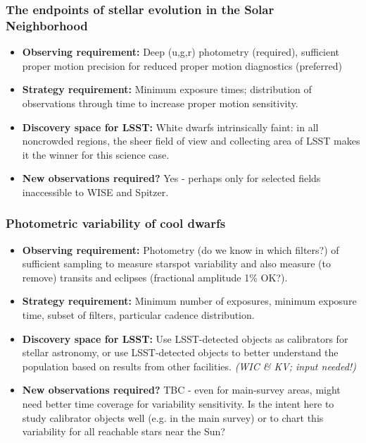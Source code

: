 \subsubsection{The endpoints of stellar evolution in the Solar Neighborhood}
\vspace{-2mm}
\begin{itemize}
\item {\bf Observing requirement:} Deep (u,g,r) photometry (required), sufficient proper motion precision for reduced proper motion diagnostics (preferred)
\vspace{-2mm}
\item {\bf Strategy requirement:} Minimum exposure times; distribution of observations through time to increase proper motion sensitivity.
\vspace{-2mm}
\item {\bf Discovery space for LSST:} White dwarfs intrinsically faint: in all noncrowded regions, the sheer field of view and collecting area of LSST makes it the winner for this science case.
\vspace{-2mm}
\item {\bf New observations required?} Yes - perhaps only for selected fields inaccessible to WISE and Spitzer.
\end{itemize}

\subsubsection{Photometric variability of cool dwarfs}
\vspace{-2mm}
\begin{itemize}
\item {\bf Observing requirement:} Photometry (do we know in which filters?) of sufficient sampling to measure starspot variability and also measure (to remove) transits and eclipses (fractional amplitude 1\% OK?). \vspace{-2mm}
\item {\bf Strategy requirement:} Minimum number of exposures, minimum exposure time, subset of filters, particular cadence distribution. \vspace{-2mm}
\item {\bf Discovery space for LSST:} Use LSST-detected objects as calibrators for stellar astronomy, or use LSST-detected objects to better understand the population based on results from other facilities. {\it (WIC \& KV; input needed!)} \vspace{-2mm}
\item {\bf New observations required?} TBC - even for main-survey areas, might need better time coverage for variability sensitivity. Is the intent here to study calibrator objects well (e.g. in the main survey) or to chart this variability for all reachable stars near the Sun?
\end{itemize}

